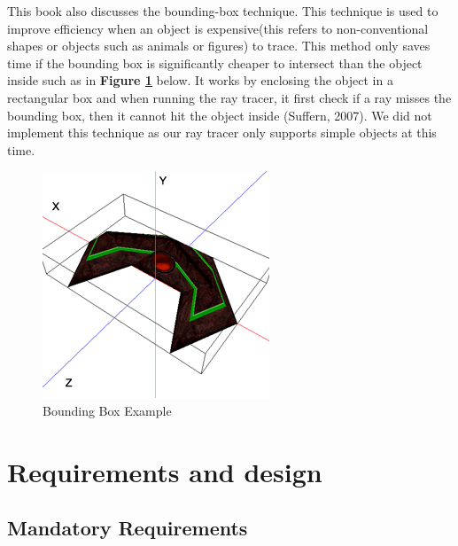 \documentclass[a4paper]{report}
\begin{document}
	\par This book also discusses the bounding-box technique. This technique is used to improve efficiency when an object is expensive(this refers to non-conventional shapes or objects such as animals or figures) to trace. This method only saves time if the bounding box is significantly cheaper to intersect than the object inside such as in \textbf{Figure \ref{fig:boundingbox}} below. It works by enclosing the object in a rectangular box and when running the ray tracer, it first check if a ray misses the bounding box, then it cannot hit the object inside (Suffern, 2007). We did not implement this technique as our ray tracer only supports simple objects at this time.
	
	\begin{figure}[ht!]
		\centering
		\includegraphics[scale=0.60]{./boundingbox.png}
		\caption{Bounding Box Example}
		\label{fig:boundingbox}
	\end{figure}
	
	
	
	\chapter{Requirements and design}
	
	
	\section{Mandatory Requirements}
	
\end{document}
